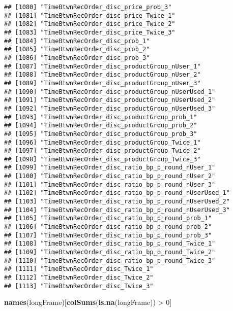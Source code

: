 \documentclass[10pt]{report}
\newenvironment{Shaded}{}{}
\newcommand{\KeywordTok}[1]{\textcolor[rgb]{0.00,0.44,0.13}{\textbf{{#1}}}}
\newcommand{\DecValTok}[1]{\textcolor[rgb]{0.25,0.63,0.44}{{#1}}}
\newcommand{\StringTok}[1]{\textcolor[rgb]{0.25,0.44,0.63}{{#1}}}
\newcommand{\NormalTok}[1]{{#1}}
\begin{document}
\begin{verbatim}
## [1080] "TimeBtwnRecOrder_disc_price_prob_3"                   
## [1081] "TimeBtwnRecOrder_disc_price_Twice_1"                  
## [1082] "TimeBtwnRecOrder_disc_price_Twice_2"                  
## [1083] "TimeBtwnRecOrder_disc_price_Twice_3"                  
## [1084] "TimeBtwnRecOrder_disc_prob_1"                         
## [1085] "TimeBtwnRecOrder_disc_prob_2"                         
## [1086] "TimeBtwnRecOrder_disc_prob_3"                         
## [1087] "TimeBtwnRecOrder_disc_productGroup_nUser_1"           
## [1088] "TimeBtwnRecOrder_disc_productGroup_nUser_2"           
## [1089] "TimeBtwnRecOrder_disc_productGroup_nUser_3"           
## [1090] "TimeBtwnRecOrder_disc_productGroup_nUserUsed_1"       
## [1091] "TimeBtwnRecOrder_disc_productGroup_nUserUsed_2"       
## [1092] "TimeBtwnRecOrder_disc_productGroup_nUserUsed_3"       
## [1093] "TimeBtwnRecOrder_disc_productGroup_prob_1"            
## [1094] "TimeBtwnRecOrder_disc_productGroup_prob_2"            
## [1095] "TimeBtwnRecOrder_disc_productGroup_prob_3"            
## [1096] "TimeBtwnRecOrder_disc_productGroup_Twice_1"           
## [1097] "TimeBtwnRecOrder_disc_productGroup_Twice_2"           
## [1098] "TimeBtwnRecOrder_disc_productGroup_Twice_3"           
## [1099] "TimeBtwnRecOrder_disc_ratio_bp_p_round_nUser_1"       
## [1100] "TimeBtwnRecOrder_disc_ratio_bp_p_round_nUser_2"       
## [1101] "TimeBtwnRecOrder_disc_ratio_bp_p_round_nUser_3"       
## [1102] "TimeBtwnRecOrder_disc_ratio_bp_p_round_nUserUsed_1"   
## [1103] "TimeBtwnRecOrder_disc_ratio_bp_p_round_nUserUsed_2"   
## [1104] "TimeBtwnRecOrder_disc_ratio_bp_p_round_nUserUsed_3"   
## [1105] "TimeBtwnRecOrder_disc_ratio_bp_p_round_prob_1"        
## [1106] "TimeBtwnRecOrder_disc_ratio_bp_p_round_prob_2"        
## [1107] "TimeBtwnRecOrder_disc_ratio_bp_p_round_prob_3"        
## [1108] "TimeBtwnRecOrder_disc_ratio_bp_p_round_Twice_1"       
## [1109] "TimeBtwnRecOrder_disc_ratio_bp_p_round_Twice_2"       
## [1110] "TimeBtwnRecOrder_disc_ratio_bp_p_round_Twice_3"       
## [1111] "TimeBtwnRecOrder_disc_Twice_1"                        
## [1112] "TimeBtwnRecOrder_disc_Twice_2"                        
## [1113] "TimeBtwnRecOrder_disc_Twice_3"
\end{verbatim}

\begin{Shaded}
\begin{Highlighting}[]
\KeywordTok{names}\NormalTok{(longFrame)[}\KeywordTok{colSums}\NormalTok{(}\KeywordTok{is.na}\NormalTok{(longFrame)) >}\StringTok{ }\DecValTok{0}\NormalTok{]}
\end{Highlighting}
\end{Shaded}
\end{document}
